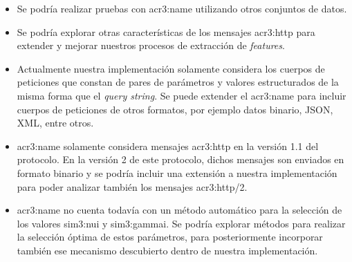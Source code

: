 \begin{itemize}
    \item
    Se podría realizar pruebas con \gls{acr3:name} utilizando otros
    conjuntos de datos.

    \item
    Se podría explorar otras características de los mensajes \gls{acr3:http}
    para extender y mejorar nuestros procesos de extracción de \textit{features}.

    \item
    Actualmente nuestra implementación solamente considera los cuerpos
    de peticiones que constan de pares de parámetros y valores estructurados
    de la misma forma que el \textit{query string}. Se puede extender el
    \gls{acr3:name} para incluir cuerpos de peticiones de otros formatos,
    por ejemplo datos binario, JSON, XML, entre otros.

    \item
    \gls{acr3:name} solamente considera mensajes \gls{acr3:http} en la
    versión 1.1 del protocolo. En la versión 2 de este protocolo, dichos
    mensajes son enviados en formato binario \cite{belshe2015http2} %
    y se podría incluir una extensión a nuestra implementación para poder
    analizar también los mensajes \gls{acr3:http}/2.

    \item
    \gls{acr3:name} no cuenta todavía con un método automático para
    la selección de los valores \gls{sim3:nui} y \gls{sim3:gammai}.
    Se podría explorar métodos para realizar la selección óptima de
    estos parámetros, para posteriormente incorporar también ese
    mecanismo descubierto dentro de nuestra implementación.
\end{itemize}
